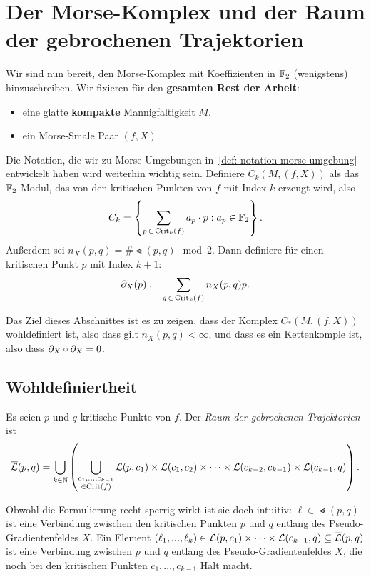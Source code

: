 \section{Der Morse-Komplex und der Raum der gebrochenen Trajektorien}

Wir sind nun bereit, den Morse-Komplex mit Koeffizienten in ${ \mathbb F }_2$ (wenigstens) hinzuschreiben.
Wir fixieren für den \textbf{gesamten Rest der Arbeit}: 
\begin{itemize}
    \item eine glatte \textbf{kompakte} Mannigfaltigkeit $M$.
    \item ein Morse-Smale Paar $(f, X)$.
\end{itemize}
Die Notation, die wir zu Morse-Umgebungen in~\ref{def: notation morse umgebung} entwickelt haben 
wird weiterhin wichtig sein. Definiere $C_k (M, (f, X))$ als das ${ \mathbb F }_2$-Modul, 
das von den kritischen Punkten von $f$ mit Index $k$ erzeugt wird, also
\[ C_k = \left\{ \sum_{p \, \in \, { \operatorname{Crit} }_k (f)} a_p \cdot p : a_p \in { \mathbb F }_2 \right\} . \] 
Außerdem sei 
$n_X(p, q) = \# \Lt (p, q) \mod 2$. Dann definiere für einen kritischen Punkt $p$ mit Index $k + 1$:
\[ { \partial }_X (p) := \sum_{q \, \in \, { \operatorname{Crit} }_{k}(f)} n_X(p, q)p . \]

Das Ziel dieses Abschnittes ist es zu zeigen, dass der Komplex $C_{\ast}(M, (f, X))$ wohldefiniert
ist, also dass gilt $n_X (p, q) < \infty$, und dass es ein Kettenkomple ist, also dass 
${ \partial }_X \circ { \partial }_X = 0$. 

\subsection*{Wohldefiniertheit}

\begin{definition}
    \label{def: raum der gebrochenen trajektorien}
    Es seien $p$ und $q$ kritische Punkte von $f$. Der \textit{Raum der gebrochenen Trajektorien} ist
    \[ {\overline{\mathcal{L}} } (p, q) = 
        \bigcup_{k \in { \mathbb N }} \left( \bigcup_{\substack{c_1, \dots, c_{k - 1} \\ \in { \operatorname{Crit} }(f)}} 
            { \mathcal{L} } (p, c_1) \times { \mathcal{L} } (c_1, c_2) \times \dots 
                \times { \mathcal{L} } (c_{k - 2}, c_{k - 1}) \times { \mathcal{L} } (c_{k - 1}, q) \right) . \]
\end{definition}

Obwohl die Formulierung recht sperrig wirkt ist sie doch intuitiv: 
$\ell \in \Lt (p, q)$ ist eine \glqq Verbindung\grqq{} zwischen den kritischen Punkten $p$ und $q$ 
entlang des Pseudo-Gradientenfeldes $X$. Ein Element 
$(\ell_1, ..., \ell_k) \in { \mathcal{L} } (p, c_1) \times \dots \times { \mathcal{L} } (c_{k - 1}, q) \subseteq {\overline{\mathcal{L}} } (p, q)$
ist eine \glqq Verbindung\grqq{} zwischen $p$ und $q$ entlang des Pseudo-Gradientenfeldes $X$, die noch 
bei den kritischen Punkten $c_1, \dots, c_{k - 1}$ \glqq Halt\grqq{} macht. 

